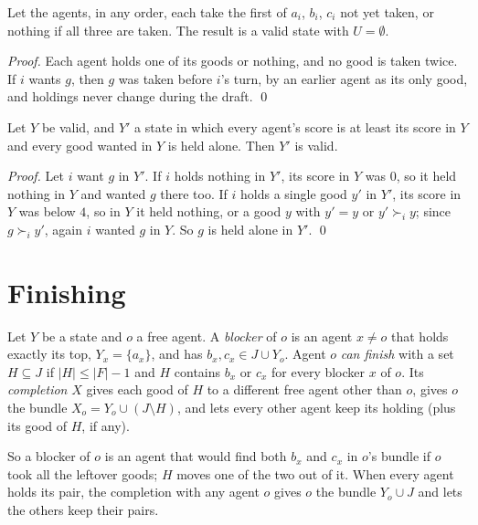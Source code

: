 \documentclass[runningheads,11pt]{llncs}
\begin{document}
\begin{lemma}\label{lem:draft}
Let the agents, in any order, each take the first of $a_i$, $b_i$, $c_i$ not yet taken, or nothing if all three are taken. The result is a valid state with $U=\emptyset$.
\end{lemma}

\begin{proof}
Each agent holds one of its goods or nothing, and no good is taken twice. If $i$ wants $g$, then $g$ was taken before $i$'s turn, by an earlier agent as its only good, and holdings never change during the draft. \qed
\end{proof}

\begin{lemma}\label{lem:stay}
Let $Y$ be valid, and $Y'$ a state in which every agent's score is at least its score in $Y$ and every good wanted in $Y$ is held alone. Then $Y'$ is valid.
\end{lemma}

\begin{proof}
Let $i$ want $g$ in $Y'$. If $i$ holds nothing in $Y'$, its score in $Y$ was $0$, so it held nothing in $Y$ and wanted $g$ there too. If $i$ holds a single good $y'$ in $Y'$, its score in $Y$ was below $4$, so in $Y$ it held nothing, or a good $y$ with $y'=y$ or $y'\succ_i y$; since $g\succ_i y'$, again $i$ wanted $g$ in $Y$. So $g$ is held alone in $Y'$. \qed
\end{proof}

\section{Finishing}\label{sec:finish}

\begin{definition}\label{def:finish}
Let $Y$ be a state and $o$ a free agent. A \emph{blocker} of $o$ is an agent $x\ne o$ that holds exactly its top, $Y_x=\{a_x\}$, and has $b_x,c_x\in J\cup Y_o$. Agent $o$ \emph{can finish} with a set $H\subseteq J$ if $|H|\le|F|-1$ and $H$ contains $b_x$ or $c_x$ for every blocker $x$ of $o$. Its \emph{completion} $X$ gives each good of $H$ to a different free agent other than $o$, gives $o$ the bundle $X_o=Y_o\cup(J\setminus H)$, and lets every other agent keep its holding (plus its good of $H$, if any).
\end{definition}

\noindent So a blocker of $o$ is an agent that would find both $b_x$ and $c_x$ in $o$'s bundle if $o$ took all the leftover goods; $H$ moves one of the two out of it. When every agent holds its pair, the completion with any agent $o$ gives $o$ the bundle $Y_o\cup J$ and lets the others keep their pairs.
\end{document}
